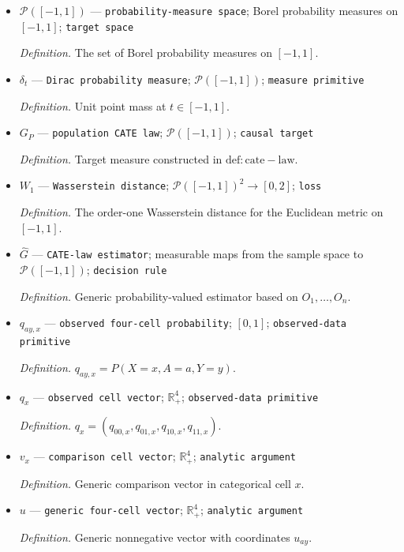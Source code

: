 \documentclass{article}
\begin{document}
\begin{itemize}
  \item \(\mathcal P([-1,1])\) --- \texttt{probability-\allowbreak{}measure space}; Borel probability measures on \([-1,1]\); \texttt{target space}
  \par\smallskip\noindent\emph{Definition.} The set of Borel probability measures on \([-1,1]\).
  \item \(\delta_t\) --- \texttt{Dirac probability measure}; \(\mathcal P([-1,1])\); \texttt{measure primitive}
  \par\smallskip\noindent\emph{Definition.} Unit point mass at \(t\in[-1,1]\).
  \item \(G_P\) --- \texttt{population CATE law}; \(\mathcal P([-1,1])\); \texttt{causal target}
  \par\smallskip\noindent\emph{Definition.} Target measure constructed in \(\mathrm{def:cate-law}\).
  \item \(W_1\) --- \texttt{Wasserstein distance}; \(\mathcal P([-1,1])^2\to[0,2]\); \texttt{loss}
  \par\smallskip\noindent\emph{Definition.} The order-one Wasserstein distance for the Euclidean metric on \([-1,1]\).
  \item \(\widehat G\) --- \texttt{CATE-\allowbreak{}law estimator}; measurable maps from the sample space to \(\mathcal P([-1,1])\); \texttt{decision rule}
  \par\smallskip\noindent\emph{Definition.} Generic probability-valued estimator based on \(O_1,\ldots,O_n\).
  \item \(q_{ay,x}\) --- \texttt{observed four-\allowbreak{}cell probability}; \([0,1]\); \texttt{observed-\allowbreak{}data primitive}
  \par\smallskip\noindent\emph{Definition.} \(q_{ay,x}=P(X=x,A=a,Y=y)\).
  \item \(q_x\) --- \texttt{observed cell vector}; \(\mathbb R_+^4\); \texttt{observed-\allowbreak{}data primitive}
  \par\smallskip\noindent\emph{Definition.} \(q_x=(q_{00,x},q_{01,x},q_{10,x},q_{11,x})\).
  \item \(v_x\) --- \texttt{comparison cell vector}; \(\mathbb R_+^4\); \texttt{analytic argument}
  \par\smallskip\noindent\emph{Definition.} Generic comparison vector in categorical cell \(x\).
  \item \(u\) --- \texttt{generic four-\allowbreak{}cell vector}; \(\mathbb R_+^4\); \texttt{analytic argument}
  \par\smallskip\noindent\emph{Definition.} Generic nonnegative vector with coordinates \(u_{ay}\).

\end{itemize}
\end{document}

